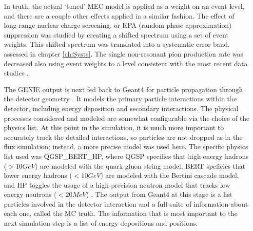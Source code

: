 In truth, the actual `tuned' MEC model is applied as a weight on an event level, and there are a couple other effects applied in a similar fashion. The effect of long-range nuclear charge screening, or RPA (random phase approximation) suppression was studied by creating a shifted spectrum using a set of event weights. This shifted spectrum was translated into a systematic error band, assessed in chapter \ref{ch:Systs}. The single non-resonant pion production rate was decreased also using event weights to a level consistent with the most recent data studies \cite{ref:TNGENIE}.

The GENIE output is next fed back to Geant4 for particle propagation through the detector geometry \cite{ref:Geant41, ref:Geant42}. It models the primary particle interactions within the detector, including energy deposition and secondary interactions. The physical processes considered and modeled are somewhat configurable via the choice of the physics list. At this point in the simulation, it is much more important to accurately track the detailed interactions, so particles are not dropped as in the flux simulation; instead, a more precise model was used here. The specific physics list used was QGSP\_BERT\_HP, where QGSP specifies that high energy hadrons ($> 10\unit{GeV}$) are modeled with the quark gluon string model, BERT speficies that lower energy hadrons ($< 10\unit{GeV}$) are modeled with the Bertini cascade model, and HP toggles the usage of a high precision neutron model that tracks low energy neutrons ($< 20\unit{MeV}$) \cite{ref:TNDetSim}. The output from Geant4 at this stage is a list particles involved in the detector interaction and a full suite of information about each one, called the MC truth. The information that is most important to the next simulation step is a list of energy depositions and positions.

